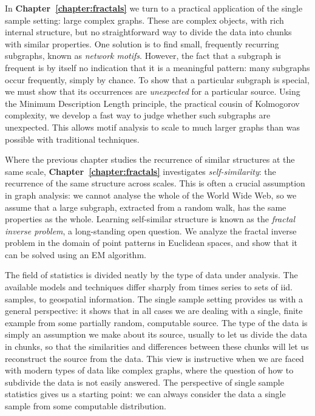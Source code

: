 \documentclass{thesis}
\theoremstyle{definition}
\begin{document}
In \textbf{Chapter~\ref{chapter:fractals}} we turn to a practical application of the single sample setting: large complex graphs. These are complex objects, with rich internal structure, but no straightforward way to divide the data into chunks with similar properties. One solution is to find small, frequently recurring subgraphs, known as \emph{network motifs}. However, the fact that a subgraph is frequent is by itself no indication that it is a meaningful pattern: many subgraphs occur frequently, simply by chance. To show that a particular subgraph is special, we must show that its occurrences are \emph{unexpected} for a particular source. Using the Minimum Description Length principle, the practical cousin of Kolmogorov complexity, we develop a fast way to judge whether such subgraphs are unexpected. This allows motif analysis to scale to much larger graphs than was possible with traditional techniques.

Where the previous chapter studies the recurrence of similar structures at the same scale, \textbf{Chapter~\ref{chapter:fractals}} investigates \emph{self-similarity}: the recurrence of the same structure across scales. This is often a crucial assumption in graph analysis: we cannot analyse the whole of the World Wide Web, so we assume that a large subgraph, extracted from a random walk, has the same properties as the whole. Learning self-similar structure is known as the \emph{fractal inverse problem}, a long-standing open question. We analyze the fractal inverse problem in the domain of point patterns in Euclidean spaces, and show that it can be solved using an EM algorithm. 

The field of statistics is divided neatly by the type of data under analysis. The available models and techniques differ sharply from times series to sets of iid. samples, to geospatial information. The single sample setting provides us with a general perspective: it shows that in all cases we are dealing with a single, finite example from some partially random, computable source. The type of the data is simply an assumption we make about its source, usually to let us divide the data in chunks, so that the similarities and differences between these chunks will let us reconstruct the source from the data. This view is instructive when we are faced with modern types of data like complex graphs, where the question of how to subdivide the data is not easily answered. The perspective of single sample statistics gives us a starting point: we can always consider the data a single sample from some computable distribution.
\end{document}
